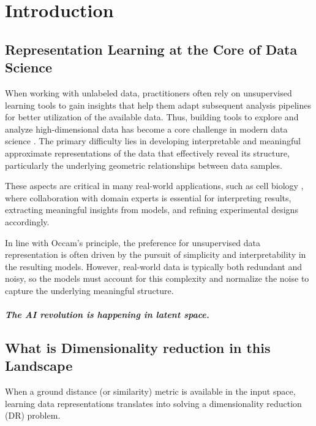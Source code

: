\chapter{Introduction}\label{chap:intro}

\minitoc

\section{Representation Learning at the Core of Data Science}

When working with unlabeled data, practitioners often rely on unsupervised learning tools to gain insights that help them adapt subsequent analysis pipelines for better utilization of the available data. Thus, building tools to explore and analyze high-dimensional data has become a core challenge in modern data science \citep{donoho2000high, rudin2022interpretable}. The primary difficulty lies in developing interpretable and meaningful approximate representations of the data that effectively reveal its structure, particularly the underlying geometric relationships between data samples.

These aspects are critical in many real-world applications, such as cell biology \citep{regev2017human, kobak2019art, becht2019dimensionality}, where collaboration with domain experts is essential for interpreting results, extracting meaningful insights from models, and refining experimental designs accordingly.

In line with Occam's principle, the preference for unsupervised data representation is often driven by the pursuit of simplicity and interpretability in the resulting models. However, real-world data is typically both redundant and noisy, so the models must account for this complexity and normalize the noise to capture the underlying meaningful structure.


\paragraph{The AI revolution is happening in latent space.} \citep{assran2023self} \citep{rombach2022high}


\section{What is Dimensionality reduction in this Landscape}


\begin{mdframed}
When a ground distance (or similarity) metric is available in the input space, learning data representations translates into solving a dimensionality reduction (DR) problem.
\end{mdframed}

